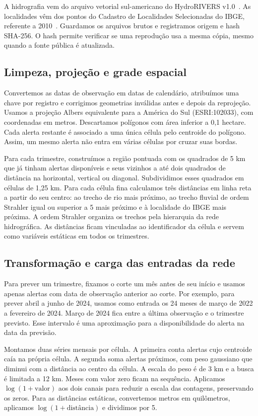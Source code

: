 \documentclass[a4paper,conference]{IEEEtran}
\begin{document}
A hidrografia vem do arquivo vetorial sul-americano do HydroRIVERS v1.0~\cite{lehner2013}. As localidades vêm dos pontos do Cadastro de Localidades Selecionadas do IBGE, referente a 2010~\cite{ibge}. Guardamos os arquivos brutos e registramos origem e hash SHA-256. O hash permite verificar se uma reprodução usa a mesma cópia, mesmo quando a fonte pública é atualizada.

\subsection{Limpeza, projeção e grade espacial}

Convertemos as datas de observação em datas de calendário, atribuímos uma chave por registro e corrigimos geometrias inválidas antes e depois da reprojeção. Usamos a projeção Albers equivalente para a América do Sul (ESRI:102033), com coordenadas em metros. Descartamos polígonos com área inferior a 0,1 hectare. Cada alerta restante é associado a uma única célula pelo centroide do polígono. Assim, um mesmo alerta não entra em várias células por cruzar suas bordas.

Para cada trimestre, construímos a região pontuada com os quadrados de 5 km que já tinham alertas disponíveis e seus vizinhos a até dois quadrados de distância na horizontal, vertical ou diagonal. Subdividimos esses quadrados em células de 1,25 km. Para cada célula fina calculamos três distâncias em linha reta a partir do seu centro: ao trecho de rio mais próximo, ao trecho fluvial de ordem Strahler igual ou superior a 5 mais próximo e à localidade do IBGE mais próxima. A ordem Strahler organiza os trechos pela hierarquia da rede hidrográfica. As distâncias ficam vinculadas ao identificador da célula e servem como variáveis estáticas em todos os trimestres.

\subsection{Transformação e carga das entradas da rede}

Para prever um trimestre, fixamos o corte um mês antes de seu início e usamos apenas alertas com data de observação anterior ao corte. Por exemplo, para prever abril a junho de 2024, usamos como entrada os 24 meses de março de 2022 a fevereiro de 2024. Março de 2024 fica entre a última observação e o trimestre previsto. Esse intervalo é uma aproximação para a disponibilidade do alerta na data da previsão.

Montamos duas séries mensais por célula. A primeira conta alertas cujo centroide caía na própria célula. A segunda soma alertas próximos, com peso gaussiano que diminui com a distância ao centro da célula. A escala do peso é de 3 km e a busca é limitada a 12 km. Meses com valor zero ficam na sequência. Aplicamos $\log(1+\text{valor})$ aos dois canais para reduzir a escala das contagens, preservando os zeros. Para as distâncias estáticas, convertemos metros em quilômetros, aplicamos $\log(1+\text{distância})$ e dividimos por 5.
\end{document}
